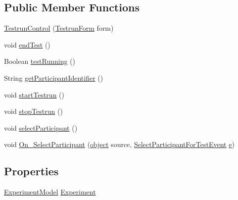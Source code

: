 \subsection*{Public Member Functions}
\begin{DoxyCompactItemize}
\item 
\hyperlink{class_web_analyzer_1_1_u_i_1_1_interaction_objects_1_1_testrun_control_a4c7cc1fb505c57b84d0247abb85eb424}{Testrun\+Control} (\hyperlink{class_web_analyzer_1_1_u_i_1_1_testrun_form}{Testrun\+Form} form)
\item 
void \hyperlink{class_web_analyzer_1_1_u_i_1_1_interaction_objects_1_1_testrun_control_afa240c157d4dca3e5399625cf59afd8c}{end\+Test} ()
\item 
Boolean \hyperlink{class_web_analyzer_1_1_u_i_1_1_interaction_objects_1_1_testrun_control_ae1dacc2d3e11d88116b3dbf9c45ea403}{test\+Running} ()
\item 
String \hyperlink{class_web_analyzer_1_1_u_i_1_1_interaction_objects_1_1_testrun_control_a91ae8944392f8e0aef79106e157091a6}{get\+Participant\+Identifier} ()
\item 
void \hyperlink{class_web_analyzer_1_1_u_i_1_1_interaction_objects_1_1_testrun_control_af27f7dfe9f65ab63b139bc58873eb689}{start\+Testrun} ()
\item 
void \hyperlink{class_web_analyzer_1_1_u_i_1_1_interaction_objects_1_1_testrun_control_a5f0c295b6abbeade6416f7a8fec63d70}{stop\+Testrun} ()
\item 
void \hyperlink{class_web_analyzer_1_1_u_i_1_1_interaction_objects_1_1_testrun_control_ad6ef95e986f389417a22a36b6e95ef36}{select\+Participant} ()
\item 
void \hyperlink{class_web_analyzer_1_1_u_i_1_1_interaction_objects_1_1_testrun_control_aa6efe805f8e05a4fb701e214d8e53bec}{On\+\_\+\+Select\+Participant} (\hyperlink{_u_i_2_h_t_m_l_resources_2js_2lib_2underscore_8min_8js_aae18b7515bb2bc4137586506e7c0c903}{object} source, \hyperlink{class_web_analyzer_1_1_events_1_1_select_participant_for_test_event}{Select\+Participant\+For\+Test\+Event} \hyperlink{_u_i_2_h_t_m_l_resources_2js_2lib_2bootstrap_8min_8js_ab5902775854a8b8440bcd25e0fe1c120}{e})
\end{DoxyCompactItemize}
\subsection*{Properties}
\begin{DoxyCompactItemize}
\item 
\hyperlink{class_web_analyzer_1_1_models_1_1_base_1_1_experiment_model}{Experiment\+Model} \hyperlink{class_web_analyzer_1_1_u_i_1_1_interaction_objects_1_1_testrun_control_a050243f65141cdf9dd7aa11125a30c0a}{Experiment}
\end{DoxyCompactItemize}
